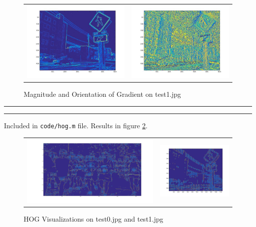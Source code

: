 \documentclass[12pt]{article}\sloppy
\newcommand{\question}[2] {\vspace{.25in} \hrule\vspace{0.5em} \noindent{\bf #1: #2} \vspace{0.5em} \hrule \vspace{.10in}}
\begin{document}
\begin{figure}[f]
\centering
\begin{tabular}{c c}
  \includegraphics[width=0.45\linewidth]{fig3.jpg} & \includegraphics[width=0.45\linewidth]{fig4.jpg} \\
\end{tabular}
\caption{Magnitude and Orientation of Gradient on test1.jpg}
\label{fig:1.1.2}
\end{figure}

\question{1.2}{hog}

Included in \texttt{code/hog.m} file. Results in figure \ref{fig:1.2.1}.

\begin{figure}[f]
\centering
\begin{tabular}{c c}
  \includegraphics[width=0.45\linewidth]{fig5.jpg} & \includegraphics[width=0.45\linewidth]{fig6.jpg} \\
\end{tabular}
\caption{HOG Visualizations on test0.jpg and test1.jpg}
\label{fig:1.2.1}
\end{figure}
\end{document}
